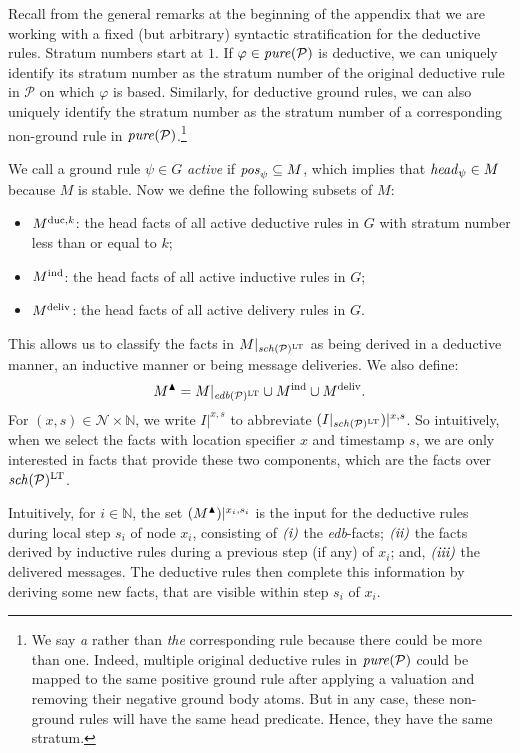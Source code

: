 \documentclass{tlp}
\newcommand{\Nat}{\mathbb{N}}  \newcommand{\len}[1]{|#1|} \newcommand{\rom}[1]{\text{\emph{(#1)}}} \newcommand{\romI}{\rom i}
\newcommand{\romII}{\rom{ii}}
\newcommand{\romIII}{\rom{iii}}
\newcommand{\ded}{\mathcal{P}}
\newcommand{\proj}[2]{#1|_{#2}}
\newcommand{\rl}{\varphi}
\newcommand{\head}[1]{\fname{head}_{#1}}
\newcommand{\bpos}[1]{\fname{pos}_{#1}}
\newcommand{\edb}[1]{\fname{edb}(#1)}
\newcommand{\schof}[1]{\fname{sch}(#1)}
\newcommand{\grl}{\psi}
\newcommand{\nw}{\mathcal{N}}
\newcommand{\toloct}[1]{#1^{\mathrm{LT}}}
\newcommand{\projlt}[3]{#1|^{#2,#3}}
\newcommand{\pure}[1]{\fname{pure}(#1)}
\newcommand{\nwnat}{\nw\times\Nat}
\newcommand{\grded}{G}
\begin{document}
\begin{appendix}
Recall from the general remarks at the beginning of the appendix that
we are working with a fixed (but arbitrary) syntactic stratification
for the deductive rules. Stratum numbers start at $1$. If $\rl\in\pure{\ded}$
is deductive, we can uniquely identify its stratum number as the stratum
number of the original deductive rule in $\ded$ on which $\rl$ is
based. Similarly, for deductive ground rules, we can also uniquely
identify the stratum number as the stratum number of a corresponding
non-ground rule in $\pure{\ded}$.\footnote{We say \emph{a} rather than \emph{the} corresponding rule because
there could be more than one. Indeed, multiple original deductive
rules in $\pure{\ded}$ could be mapped to the same positive ground
rule after applying a valuation and removing their negative ground
body atoms. But in any case, these non-ground rules will have the
same head predicate. Hence, they have the same stratum.}

We call a ground rule $\grl\in\grded$ \emph{active} if $\bpos{\grl}\subseteq M$,
which implies that $\head{\grl}\in M$ because $M$ is stable. Now
we define the following subsets of $M$:
\begin{itemize}
\item $M^{\mathrm{duc},k}$: the head facts of all active deductive rules in $\grded$
with stratum number less than or equal to $k$;
\item $M^{\mathrm{ind}}$: the head facts of all active inductive rules in $\grded$;
\item $M^{\mathrm{deliv}}$: the head facts of all active delivery rules in $\grded$.
\end{itemize}
This allows us to classify the facts in $\proj M{\toloct{\schof{\ded}}}$
as being derived in a deductive manner, an inductive manner or being
message deliveries. We also define:
\[
\up M=\proj M{\toloct{\edb{\ded}}}\cup\ind M\cup\deliv M.
\]
For $(x,s)\in\nwnat$, we write $\projlt Ixs$ to abbreviate $\projlt{(\proj I{\toloct{\schof{\ded}}})}xs$.
So intuitively, when we select the facts with location specifier $x$
and timestamp $s$, we are only interested in facts that provide these
two components, which are the facts over $\toloct{\schof{\ded}}$. 



Intuitively, for $i\in\Nat$, the set $\projlt{(\up M)}{x_{i}}{s_{i}}$
is the input for the deductive rules during local step $s_{i}$ of
node $x_{i}$, consisting of $\romI$ the \emph{edb}-facts; $\romII$
the facts derived by inductive rules during a previous step (if any)
of $x_{i}$; and, $\romIII$ the delivered messages. The deductive
rules then complete this information by deriving some new facts, that
are visible within step $s_{i}$ of $x_{i}$.




\end{appendix}
\end{document}
